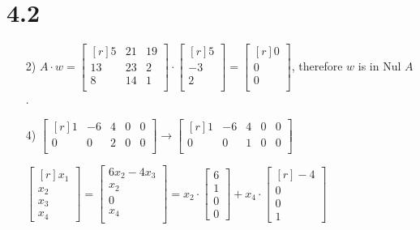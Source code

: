 \documentclass{article}
\begin{document}
  \section * {4.2}
  \begin{enumerate}
    \item[2)]
      $A\cdot w=\begin{bmatrix*}[r]
        5&21&19\\
        13&23&2\\
        8&14&1\\
        \end{bmatrix*}\cdot\begin{bmatrix*}[r]
          5\\-3\\2\\
        \end{bmatrix*}
        =\begin{bmatrix*}[r]
          0\\0\\0\\
        \end{bmatrix*}
      $, therefore $w$ is in Nul $A$.

    \item[4)]
      $\begin{bmatrix*}[r]
        1&-6&4&0&0\\
        0&0&2&0&0\\
        \end{bmatrix*}\rightarrow\begin{bmatrix*}[r]
          1&-6&4&0&0\\
          0&0&1&0&0\\
        \end{bmatrix*}$

      $\begin{bmatrix*}[r]
        x_1\\x_2\\x_3\\x_4\end{bmatrix*}
        =\begin{bmatrix*}
          6x_2-4x_3\\
          x_2\\
          0\\
          x_4\\
        \end{bmatrix*} 
        =x_2\cdot\begin{bmatrix*}
          6\\1\\0\\0\end{bmatrix*}
          +x_4\cdot\begin{bmatrix*}[r]
          -4\\0\\0\\1\end{bmatrix*}$


\end{enumerate}
\end{document}
